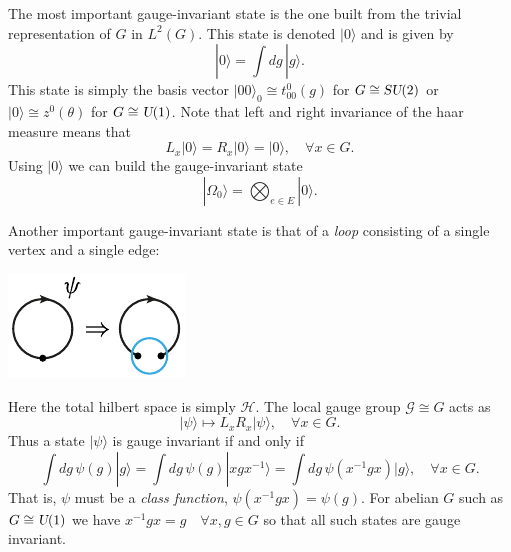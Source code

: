 \documentclass[12pt]{amsart}
\def\su2{\textsl{SU}(2)}
\def\uone{\textsl{U}(1)}
\theoremstyle{definition}
\theoremstyle{remark}
\numberwithin{equation}{section}
\begin{document}
The most important gauge-invariant state is the one built from the trivial representation of $G$ in $L^2(G)$. This state is denoted $|0\rangle$ and is given by
\begin{equation}
	|0\rangle = \int dg\, |g\rangle.
\end{equation}
This state is simply the basis vector $|00\rangle_0 \cong t^0_{00}(g)$ for $G \cong \su2$
or $|0\rangle \cong z^0(\theta)$ for $G \cong \uone$. 
Note that left and right invariance of the haar measure means that
\begin{equation}
	L_x|0\rangle = R_x|0\rangle = |0\rangle, \quad \forall x \in G.
\end{equation}
Using $|0\rangle$ we can build the gauge-invariant state 
\begin{equation}
	|\Omega_0\rangle = \bigotimes_{e\in E} |0\rangle.
\end{equation}

Another important gauge-invariant state is that of a \emph{loop} consisting of a single vertex and a single edge:
\begin{center}
	\includegraphics{singlevertex.pdf}
\end{center}
Here the total hilbert space is simply $\mathcal{H}$. The local gauge group $\mathcal{G} \cong G$ acts as
\begin{equation}
	|\psi\rangle \mapsto L_xR_x |\psi\rangle, \quad \forall x\in G.
\end{equation}
Thus a state $|\psi\rangle$ is gauge invariant if and only if
\begin{equation}\label{eq:classstate}
	\int dg\, \psi(g) |g\rangle= \int dg\, \psi(g) |xgx^{-1}\rangle = \int dg\, \psi(x^{-1}gx) |g\rangle, \quad\forall x\in G.
\end{equation}
That is, $\psi$ must be a \emph{class function}, $\psi(x^{-1}gx) = \psi(g)$. 
For abelian $G$ such as $G \cong \uone$ we have $x^{-1}gx = g \quad \forall x,g \in G$ so that all
such states are gauge invariant.
\end{document}
